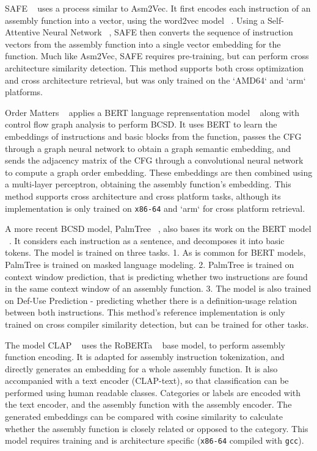 SAFE ~\cite{SAFE} uses a process similar to Asm2Vec. It first encodes each instruction of an assembly function into a vector,
using the word2vec model ~\cite{word2vec}. Using a Self-Attentive Neural Network ~\cite{SANN}, SAFE then converts the sequence of instruction
vectors from the assembly function into a single vector embedding for the function. Much like Asm2Vec, SAFE requires
pre-training, but can perform cross architecture similarity detection. This method supports both cross optimization
and cross architecture retrieval, but was only trained on the `AMD64` and `arm` platforms.

Order Matters ~\cite{OrderMatters} applies a BERT language reprensentation model ~\cite{BERT} along with control flow graph analysis
to perform BCSD. It uses BERT to learn the embeddings of instructions and basic blocks from the function,
passes the CFG through a graph neural network to obtain a graph semantic embedding, and sends the adjacency
matrix of the CFG through a convolutional neural network to compute a graph order embedding. These embeddings
are then combined using a multi-layer perceptron, obtaining the assembly function's embedding. This method
supports cross architecture and cross platform tasks, although its implementation is only trained on \texttt{x86-64}
and `arm` for cross platform retrieval.

A more recent BCSD model, PalmTree ~\cite{PalmTree}, also bases its work on the BERT model ~\cite{BERT}.
It considers each instruction as a sentence, and decomposes it into basic tokens. The model is trained
on three tasks. 1. As is common for BERT models, PalmTree is trained on masked language modeling. 2.
PalmTree is trained on context window prediction, that is predicting whether two instructions are found
in the same context window of an assembly function. 3. The model is also trained on Def-Use Prediction -
predicting whether there is a definition-usage relation between both instructions. This method's
reference implementation is only trained on cross compiler similarity detection, but can be trained
for other tasks.

The model CLAP ~\cite{CLAP} uses the RoBERTa ~\cite{RoBERTa} base model, to perform assembly function encoding.
It is adapted for assembly instruction tokenization, and directly generates an embedding for
a whole assembly function. It is also accompanied with a text encoder (CLAP-text), so that classification can
be performed using human readable classes. Categories or labels are encoded with the text encoder, and the
assembly function with the assembly encoder. The generated embeddings can be compared with cosine similarity to
calculate whether the assembly function is closely related or opposed to the category. This model requires
training and is architecture specific (\texttt{x86-64} compiled with \texttt{gcc}).


